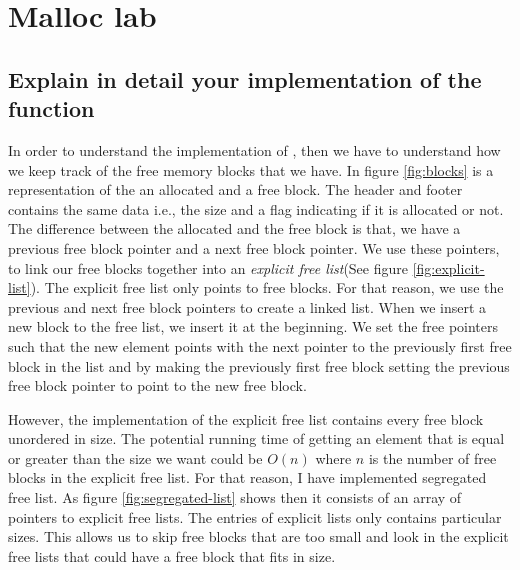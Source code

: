 \section{Malloc lab}

\subsection{Explain in detail your implementation of the  function}
In order to understand the implementation of , then we have to understand how we keep track of the free memory blocks that we have.
In figure \ref{fig:blocks} is a representation of the an allocated and a free block. The header and footer contains the same data i.e., the size and a flag indicating if it is allocated or not.
The difference between the allocated and the free block is that, we have a previous free block pointer and a next free block pointer. We use these pointers,
to link our free blocks together into an \textit{explicit free list}(See figure \ref{fig:explicit-list}).
The explicit free list only points to free blocks. For that reason, we use the previous and next free block pointers to create a linked list. 
When we insert a new block to the free list, we insert it at the beginning. We set the free pointers such that the new element points with the next pointer to the previously first free block in the list and by making the previously
first free block setting the previous free block pointer to point to the new free block.

However, the implementation of the explicit free list contains every free block unordered in size. The potential running time of getting an
element that is equal or greater than the size we want could be $O(n)$ where $n$ is the number of free blocks in the explicit free list.
For that reason, I have implemented segregated free list. As figure \ref{fig:segregated-list} shows then it consists of an array of pointers to 
explicit free lists. The entries of explicit lists only contains particular sizes. 
This allows us to skip free blocks that are too small and look in the explicit free lists that could have a free block that fits in size.

